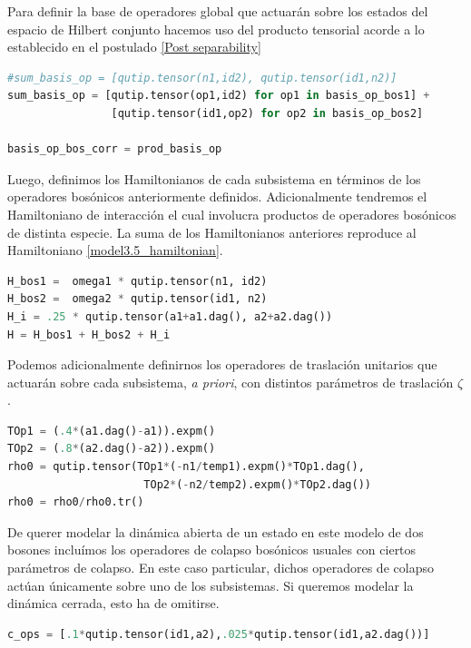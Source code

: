 \documentclass{report} %
\numberwithin{equation}{section}
\begin{document}
Para definir la base de operadores global que actuarán sobre los estados del espacio de Hilbert conjunto  hacemos uso del producto tensorial acorde a lo establecido en el postulado \ref{Post separability}

\begin{lstlisting}[language=Python]
#sum_basis_op = [qutip.tensor(n1,id2), qutip.tensor(id1,n2)]
sum_basis_op = [qutip.tensor(op1,id2) for op1 in basis_op_bos1] +
                [qutip.tensor(id1,op2) for op2 in basis_op_bos2]

basis_op_bos_corr = prod_basis_op
\end{lstlisting}

Luego, definimos los Hamiltonianos de cada subsistema en términos de los operadores bosónicos anteriormente definidos. Adicionalmente tendremos el Hamiltoniano de interacción el cual involucra productos de operadores bosónicos de distinta especie. La suma de los Hamiltonianos anteriores reproduce al Hamiltoniano \eqref{model3.5_hamiltonian}. 

\begin{lstlisting}[language=Python]
H_bos1 =  omega1 * qutip.tensor(n1, id2)
H_bos2 =  omega2 * qutip.tensor(id1, n2)
H_i = .25 * qutip.tensor(a1+a1.dag(), a2+a2.dag())
H = H_bos1 + H_bos2 + H_i
\end{lstlisting}

Podemos adicionalmente definirnos los operadores de traslación unitarios \cite{CohenTannoudji1989} que actuarán sobre cada subsistema, \textit{a priori}, con distintos parámetros de traslación $\zeta$.

\begin{lstlisting}[language=Python]
TOp1 = (.4*(a1.dag()-a1)).expm()
TOp2 = (.8*(a2.dag()-a2)).expm()
rho0 = qutip.tensor(TOp1*(-n1/temp1).expm()*TOp1.dag(), 
                     TOp2*(-n2/temp2).expm()*TOp2.dag())
rho0 = rho0/rho0.tr()

\end{lstlisting}

De querer modelar la dinámica abierta de un estado en este modelo de dos bosones incluímos los operadores de colapso bosónicos usuales con ciertos parámetros de colapso. En este caso particular, dichos operadores de colapso actúan únicamente sobre uno de los subsistemas. Si queremos modelar la dinámica cerrada, esto ha de omitirse. 
\begin{lstlisting}[language=Python]
c_ops = [.1*qutip.tensor(id1,a2),.025*qutip.tensor(id1,a2.dag())]
\end{lstlisting}
\end{document}
